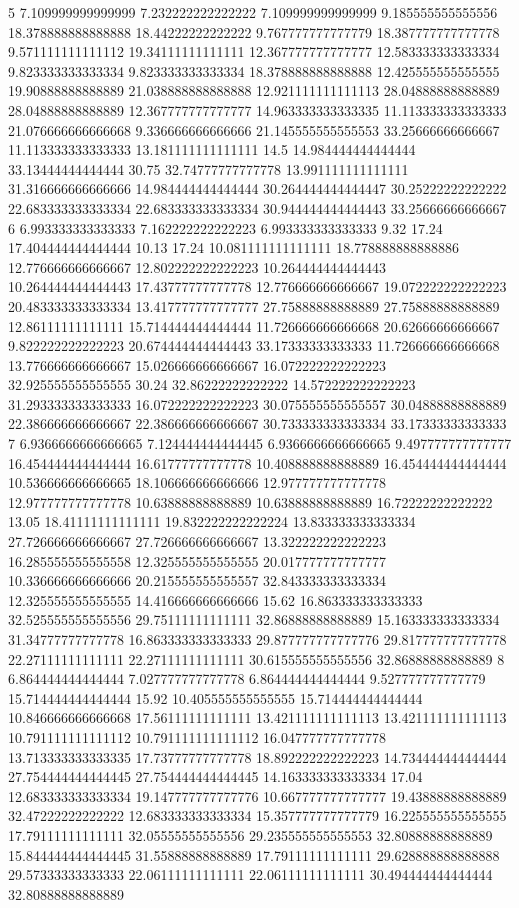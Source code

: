 5 7.109999999999999 7.232222222222222 7.109999999999999 9.185555555555556 18.378888888888888 18.44222222222222 9.767777777777779 18.387777777777778 9.571111111111112 19.34111111111111 12.367777777777777 12.583333333333334 9.823333333333334 9.823333333333334 18.378888888888888 12.425555555555555 19.90888888888889 21.038888888888888 12.921111111111113 28.04888888888889 28.04888888888889 12.367777777777777 14.963333333333335 11.113333333333333 21.076666666666668 9.336666666666666 21.145555555555553 33.25666666666667 11.113333333333333 13.181111111111111 14.5 14.984444444444444 33.13444444444444 30.75 32.74777777777778 13.991111111111111 31.316666666666666 14.984444444444444 30.264444444444447 30.25222222222222 22.683333333333334 22.683333333333334 30.944444444444443 33.25666666666667
6 6.993333333333333 7.162222222222223 6.993333333333333 9.32 17.24 17.404444444444444 10.13 17.24 10.081111111111111 18.778888888888886 12.776666666666667 12.802222222222223 10.264444444444443 10.264444444444443 17.43777777777778 12.776666666666667 19.072222222222223 20.483333333333334 13.417777777777777 27.75888888888889 27.75888888888889 12.86111111111111 15.714444444444444 11.726666666666668 20.62666666666667 9.822222222222223 20.674444444444443 33.17333333333333 11.726666666666668 13.776666666666667 15.026666666666667 16.072222222222223 32.925555555555555 30.24 32.86222222222222 14.572222222222223 31.293333333333333 16.072222222222223 30.075555555555557 30.04888888888889 22.386666666666667 22.386666666666667 30.733333333333334 33.17333333333333
7 6.9366666666666665 7.124444444444445 6.9366666666666665 9.497777777777777 16.454444444444444 16.61777777777778 10.408888888888889 16.454444444444444 10.536666666666665 18.106666666666666 12.977777777777778 12.977777777777778 10.63888888888889 10.63888888888889 16.72222222222222 13.05 18.41111111111111 19.832222222222224 13.833333333333334 27.726666666666667 27.726666666666667 13.322222222222223 16.285555555555558 12.325555555555555 20.017777777777777 10.336666666666666 20.215555555555557 32.843333333333334 12.325555555555555 14.416666666666666 15.62 16.863333333333333 32.525555555555556 29.75111111111111 32.86888888888889 15.163333333333334 31.34777777777778 16.863333333333333 29.877777777777776 29.817777777777778 22.27111111111111 22.27111111111111 30.615555555555556 32.86888888888889
8 6.864444444444444 7.027777777777778 6.864444444444444 9.527777777777779 15.714444444444444 15.92 10.405555555555555 15.714444444444444 10.846666666666668 17.56111111111111 13.421111111111113 13.421111111111113 10.791111111111112 10.791111111111112 16.047777777777778 13.713333333333335 17.73777777777778 18.892222222222223 14.734444444444444 27.754444444444445 27.754444444444445 14.163333333333334 17.04 12.683333333333334 19.147777777777776 10.667777777777777 19.43888888888889 32.47222222222222 12.683333333333334 15.357777777777779 16.225555555555555 17.79111111111111 32.05555555555556 29.235555555555553 32.80888888888889 15.844444444444445 31.55888888888889 17.79111111111111 29.628888888888888 29.57333333333333 22.06111111111111 22.06111111111111 30.494444444444444 32.80888888888889
